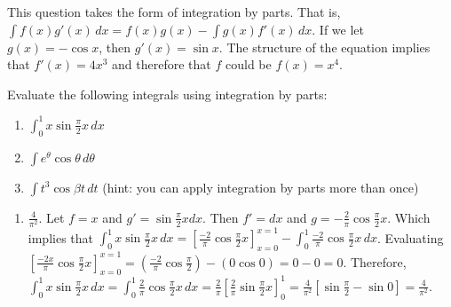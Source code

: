 \begin{Answer}[ref=int_meth3]
This question takes the form of integration by parts. That is, $\int 
f(x)g'(x)\,dx = f(x)g(x) - \int g(x)f'(x)\,dx$. If we let $g(x) = 
-\cos{x}$, then $g'(x) =\sin{x}$. The structure of the equation 
implies that $f'(x) = 4x^3$ and therefore that $f$ could be $f(x) = 
x^4$. 
\end{Answer}

\begin{Exercise}[label = int_meth5]
Evaluate the following integrals using integration by parts:
\begin{enumerate}
\item $\int_0^{1} x \sin{\frac{\pi}{2} x}\,dx$
\item $\int e^{\theta} \cos{\theta}\,d\theta$
\item $\int t^3 \cos{\beta t}\,dt$ (hint: you can apply integration by parts 
more than once)
\end{enumerate}
\vspace{60mm}
\end{Exercise}

\begin{Answer}[ref = int_meth5]
\begin{enumerate}
\item $\frac{4}{\pi^2}$. Let $f = x$ and $g' = \sin{\frac{\pi}{2}x}dx$. Then 
$f' = dx$ and $g = -\frac{2}{\pi}\cos{\frac{\pi}{2}x}$. Which implies that 
$\int_0^{1} x \sin{\frac{\pi}{2} x}\,dx = \left[ \frac{-2}{\pi}\cos{\frac{\pi}{
2}x} \right]_{x=0}^{x=1} - \int_0^1 \frac{-2}{\pi}\cos{\frac{\pi}{2}x}\,dx$. 
Evaluating $\left[ \frac{-2x}{\pi}\cos{\frac{\pi}{2}x} \right]_{x=0}^{x=1} = 
\left( \frac{-2}{\pi}\cos{\frac{\pi}{2}} \right) - \left(0 \cos{0} \right) = 0 
- 0 = 0$. Therefore, $\int_0^{1} x \sin{\frac{\pi}{2} x}\,dx = \int_0^1 \frac{2
}{\pi}\cos{\frac{\pi}{2}x}\,dx = \frac{2}{\pi} \left[\frac{2}{\pi}\sin{\frac{
\pi}{2}x} \right]_0^1 = \frac{4}{\pi^2} \left[ \sin{\frac{\pi}{2}} - \sin{0} 
\right] = \frac{4}{\pi^2}$. 
\end{enumerate}
\end{Answer}